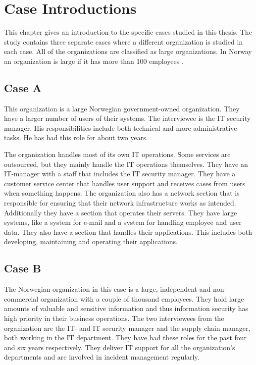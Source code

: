 \chapter{Case Introductions}
\label{chp:CaseIntroductions}
This chapter gives an introduction to the specific cases studied in this thesis. The study contains three separate cases where a different organization is studied in each case. All of the organizations are classified as large organizations. In Norway an organization is large if it has more than 100 employees \cite{SMB}.

\section{Case A}
This organization is a large Norwegian government-owned organization. They have a larger number of users of their systems. The interviewee is the IT security manager. His responsibilities include both technical and more administrative tasks. He has had this role for about two years.

The organization handles most of its own IT operations. Some services are outsourced, but they mainly handle the IT operations themselves. They have an IT-manager with a staff that includes the IT security manager. They have a customer service center %
that handles user support and receives cases from users when something happens. The organization also has a network section that is responsible for ensuring that their network infrastructure works as intended. Additionally they have a section that operates their servers. They have large systems, like a system for e-mail and a system for handling employee and user data. They also have a section that handles their applications. This includes both developing, maintaining and operating their applications.

\section{Case B}
The Norwegian organization in this case is a large, independent and non-commercial organization with a couple of thousand employees. They hold large amounts of valuable and sensitive information and thus information security has high priority in their business operations. The two interviewees from the organization are the IT- and IT security manager and the supply chain manager, both working in the IT department. They have had these roles for the past four and six years respectively. They deliver IT support for all the organization's departments and are involved in incident management regularly.   

